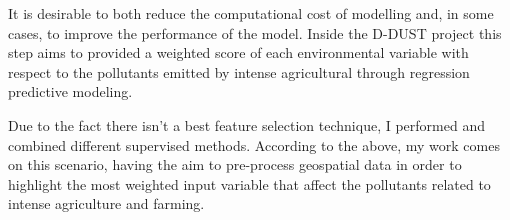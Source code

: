 It is desirable to both reduce the computational cost of modelling and, in some cases, to improve the performance of the model.\newline
Inside the D-DUST project this step aims to provided a weighted score of each environmental variable with respect to the pollutants emitted by intense agricultural through regression predictive modeling.\newline
\par
Due to the fact there isn’t a best feature selection technique, I performed and combined different supervised methods. 
\bigbreak
According to the above, my work comes on this scenario, having the aim to pre-process geospatial data in order to highlight the most weighted input variable that affect the pollutants related to intense agriculture and farming.\newline




